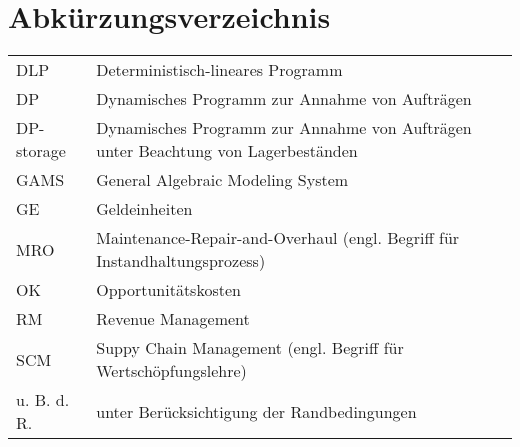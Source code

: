 \documentclass[a4paper,12pt,normalheadings,footexclude,headinclude,liststotoc,nochapterprefix,onecolumn,oneside,parskip,pointlessnumbers]{scrreprt}
\begin{document}
\chapter*{Abkürzungsverzeichnis}
\begin{table}[h!]
    \vspace*{-3mm}
    \hspace*{2mm}
  \renewcommand{\arraystretch}{1,5}
  \begin{flushleft}
    \begin{tabular}{lp{11.5cm}}  %
        DLP			& Deterministisch-lineares Programm\\
        DP  			 & Dynamisches Programm zur Annahme von Aufträgen\\
        DP-storage		    & Dynamisches Programm zur Annahme von Aufträgen unter Beachtung von Lagerbeständen\\
        GAMS 		& General Algebraic Modeling System\\
        GE & Geldeinheiten \\
        MRO & Maintenance-Repair-and-Overhaul (engl. Begriff für Instandhaltungsprozess)\\
     OK		    & Opportunitätskosten\\
     RM		    & Revenue Management\\
     SCM & Suppy Chain Management (engl. Begriff für Wertschöpfungslehre) \\
    u. B. d. R. & unter Berücksichtigung der Randbedingungen\\
	\end{tabular}
	\end{flushleft}
\end{table}

\end{document}
